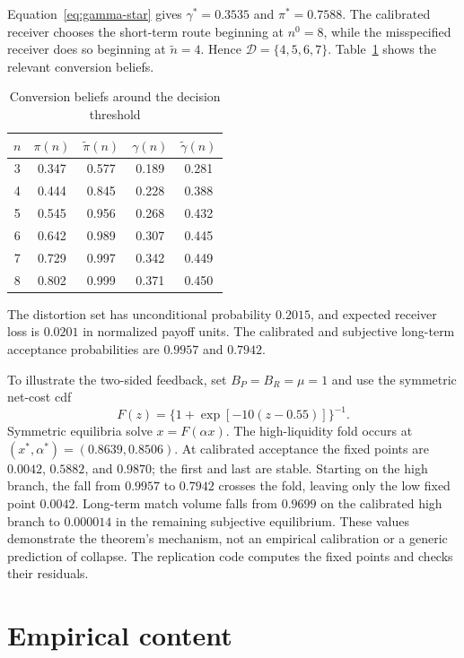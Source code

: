 \documentclass[11pt]{article}
\begin{document}
Equation~\eqref{eq:gamma-star} gives $\gamma^*=0.3535$ and
$\pi^*=0.7588$. The calibrated receiver chooses the short-term route beginning
at $n^0=8$, while the misspecified receiver does so beginning at
$\widetilde n=4$. Hence $\mathcal D=\{4,5,6,7\}$. Table~\ref{tab:posteriors}
shows the relevant conversion beliefs.

\begin{table}[ht]
\centering
\caption{Conversion beliefs around the decision threshold}
\label{tab:posteriors}
\begin{tabular}{ccccc}
\toprule
$n$ & $\pi(n)$ & $\widetilde\pi(n)$ & $\gamma(n)$
& $\widetilde\gamma(n)$ \\
\midrule
3 & 0.347 & 0.577 & 0.189 & 0.281 \\
4 & 0.444 & 0.845 & 0.228 & 0.388 \\
5 & 0.545 & 0.956 & 0.268 & 0.432 \\
6 & 0.642 & 0.989 & 0.307 & 0.445 \\
7 & 0.729 & 0.997 & 0.342 & 0.449 \\
8 & 0.802 & 0.999 & 0.371 & 0.450 \\
\bottomrule
\end{tabular}
\end{table}

The distortion set has unconditional probability $0.2015$, and expected
receiver loss is $0.0201$ in normalized payoff units. The calibrated and
subjective long-term acceptance probabilities are $0.9957$ and $0.7942$.

To illustrate the two-sided feedback, set $B_P=B_R=\mu=1$ and use the symmetric
net-cost cdf
\[
F(z)=\{1+\exp[-10(z-0.55)]\}^{-1}.
\]
Symmetric equilibria solve $x=F(\alpha x)$. The high-liquidity fold occurs at
$(x^*,\alpha^*)=(0.8639,0.8506)$. At calibrated acceptance the fixed points are
$0.0042$, $0.5882$, and $0.9870$; the first and last are stable. Starting on
the high branch, the fall from $0.9957$ to $0.7942$ crosses the fold, leaving
only the low fixed point $0.0042$. Long-term match volume falls from $0.9699$
on the calibrated high branch to $0.000014$ in the remaining subjective
equilibrium. These values demonstrate the theorem's mechanism, not an empirical
calibration or a generic prediction of collapse. The replication code computes
the fixed points and checks their residuals.

\section{Empirical content}\label{sec:empirics}
\end{document}
